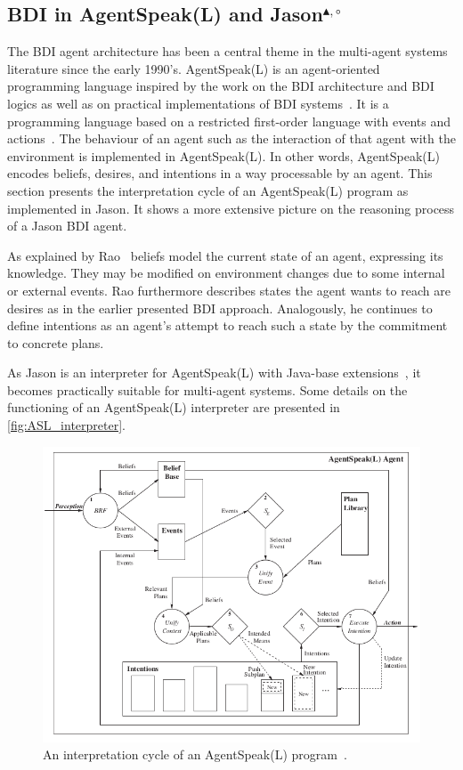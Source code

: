 \subsection[BDI in AgentSpeak(L) and Jason]{BDI in AgentSpeak(L) and Jason$^{\blacktriangle,\circ}$}
The BDI agent architecture has been a central theme in the multi-agent systems literature since the early 1990's.
AgentSpeak(L) is an agent-oriented programming language inspired by the work on the BDI architecture and BDI logics as well as on practical implementations of BDI systems~\cite{rafael_BDIAgent_2005}. %
It is a programming language based on a restricted first-order language with events and actions~\cite{anand_AgentSpeak_1996}. %
The behaviour of an agent such as the interaction of that agent with the environment is implemented in AgentSpeak(L).
In other words, AgentSpeak(L) encodes beliefs, desires, and intentions in a way processable by an agent.
This section presents the interpretation cycle of an AgentSpeak(L) program as implemented in Jason.
It shows a more extensive picture on the reasoning process of a Jason BDI agent.

As explained by Rao~\cite{anand_AgentSpeak_1996} beliefs model the current state of an agent, expressing its knowledge.
They may be modified on environment changes due to some internal or external events.
Rao furthermore describes states the agent wants to reach are desires as in the earlier presented BDI approach.
Analogously, he continues to define intentions as an agent's attempt to reach such a state by the commitment to concrete plans.

As Jason is an interpreter for AgentSpeak(L) with Java-base extensions~\cite{rafael_Javabased}, it becomes practically suitable for multi-agent systems.
Some details on the functioning of an AgentSpeak(L) interpreter are presented in \autoref{fig:ASL_interpreter}.
\begin{figure}[h]
  \centering
  \includegraphics[width=\textwidth]{images/BDI_ASL_interpreter}
  \caption{An interpretation cycle of an AgentSpeak(L) program~\cite{rafael_BDIAgent_2005}.}
  \label{fig:ASL_interpreter}
\end{figure}

